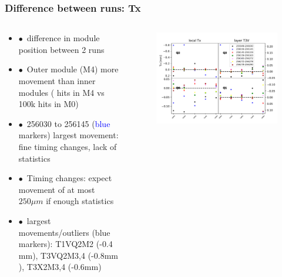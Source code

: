 \documentclass[aspectratio=1610, 12pt]{beamer}
\begin{document}
\begin{frame}
\begin{columns}
\begin{column}[c]{0.48\textwidth}
\begin{figure}
      \end{figure}
    \end{column}
  \end{columns}
\end{frame}

\begin{frame}\frametitle{Difference between runs: Tx}
  \begin{columns}
    \begin{column}[c]{0.48\textwidth}
      \begin{itemize}
        \setlength\itemsep{0em}
        \item $\bullet$\, difference in module position between 2 runs
        \item $\bullet$\, Outer module (M4) more movement than inner modules ( hits in M4 vs 100k hits in M0)
        \item $\bullet$\, 256030 to 256145 (\textcolor{blue}{blue} markers) largest movement: fine timing changes, lack of statistics
        \item $\bullet$\, Timing changes: expect movement of at most $250 \mu m$ if enough statistics
        \item $\bullet$\, largest movements/outliers (blue markers): T1VQ2M2 (-0.4$\text{mm}$), T3VQ2M{3,4} (-0.8$\text{mm}$), T3X2M{3,4} (-0.6$\text{mm}$)
      \end{itemize}
    \end{column}
      \begin{column}[c]{0.48\textwidth}
        \begin{figure}
          \includegraphics[width=\textwidth]{plots/stability_plots/diff_data_T3V_Tx.pdf}
        \end{figure}
      \end{column}
  \end{columns}
\end{frame}
\end{document}
